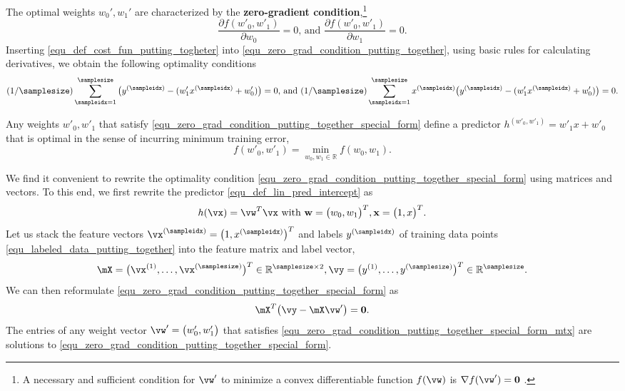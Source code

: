 \documentclass[12pt]{report}
\begin{document}
The optimal weights $w_{0}',w_{1}'$ are characterized by the 
{\bf zero-gradient condition},\footnote{A necessary and sufficient 
condition for $\vw'$ to minimize a convex differentiable function 
$f(\vw)$ is $\nabla f(\vw') = \mathbf{0}$ \cite[Sec.\ 4.2.3]{BoydConvexBook}.} 
\begin{equation}
\label{equ_zero_grad_condition_putting_together}
\frac{\partial f(w'_{0},w'_{1})}{\partial w_{0}} = 0 \mbox{, and }\frac{\partial f(w'_{0},w'_{1})}{\partial w_{1}} = 0. 
\end{equation} 
Inserting \eqref{equ_def_cost_fun_putting_togheter} into \eqref{equ_zero_grad_condition_putting_together}, 
using basic rules for calculating derivatives, we obtain the 
following optimality conditions 
\begin{equation}
\label{equ_zero_grad_condition_putting_together_special_form}
 (1/\samplesize) \sum_{\sampleidx=1}^{\samplesize} \big( y^{(\sampleidx)} - ( w'_{1} x^{(\sampleidx)} + w'_{0}) \big)= 0 \mbox{, and } (1/\samplesize) \sum_{\sampleidx=1}^{\samplesize} x^{(\sampleidx)} \big( y^{(\sampleidx)} - ( w'_{1} x^{(\sampleidx)} + w'_{0}) \big) = 0. 
\end{equation} 

Any weights $w'_{0},w'_{1}$ that satisfy \eqref{equ_zero_grad_condition_putting_together_special_form} 
define a predictor $h^{(w'_{0},w'_{1})} = w'_{1}x + w'_{0}$ that 
is optimal in the sense of incurring minimum training error, 
$$f(w'_{0},w'_{1}) = \min_{w_{0},w_{1} \in \mathbb{R}} f(w_{0},w_{1}).$$

We find it convenient to rewrite the optimality condition \eqref{equ_zero_grad_condition_putting_together_special_form} 
using matrices and vectors. To this end, we first rewrite the 
predictor \eqref{equ_def_lin_pred_intercept} as 
$$ h(\vx) = \vw^{T} \vx \mbox{ with } \mathbf{w} = \big(w_{0},w_{1}\big)^{T}, \mathbf{x} = \big(1,x\big)^{T}.$$
Let us stack the feature vectors $\vx^{(\sampleidx)} = \big(1,x^{(\sampleidx)} \big)^{T}$ 
and labels $y^{(\sampleidx)}$ of training data points \eqref{equ_labeled_data_putting_together} 
into the feature matrix and label vector, 
\begin{equation}
\mX  = \big(\vx^{(1)},\ldots,\vx^{(\samplesize)}\big)^{T} \in \mathbb{R}^{\samplesize \times 2}, \vy = \big(y^{(1)},\ldots,y^{(\samplesize)}\big)^{T} \in \mathbb{R}^{\samplesize}. 
\end{equation} 
We can then reformulate \eqref{equ_zero_grad_condition_putting_together_special_form} as 
\begin{equation}
\label{equ_zero_grad_condition_putting_together_special_form_mtx}
\mX^{T} \big( \vy - \mX \vw' \big) = \mathbf{0}. 
\end{equation} 
The entries of any weight vector $\vw' = \big(w_{0}',w_{1}'\big)$ that satisfies 
\eqref{equ_zero_grad_condition_putting_together_special_form_mtx} are solutions to 
\eqref{equ_zero_grad_condition_putting_together_special_form}. 
\end{document}
